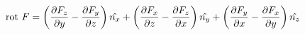 \begin{equation}
	{\rm rot}\ F=\left(\frac{\partial F_z}{\partial y}
	-\frac{\partial F_y}{\partial z}\right)\hat{n_x}
	+\left(\frac{\partial F_x}{\partial z}
	-\frac{\partial F_z}{\partial x}\right)\hat{n_y}
	+\left(\frac{\partial F_y}{\partial x}
	-\frac{\partial F_x}{\partial y}\right)\hat{n_z}
\end{equation}
